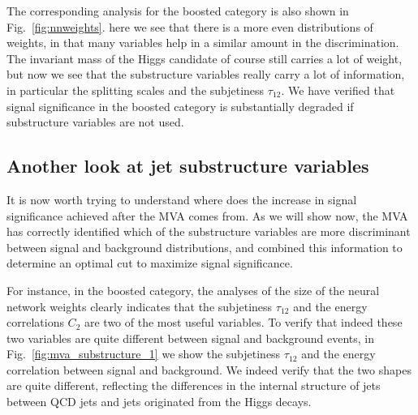 The corresponding analysis for the boosted category is also
shown in Fig.~\ref{fig:nnweights}.
%
here we see that there is a more even distributions of weights, in that many
variables help in a similar amount in the discrimination.
%
The invariant mass of the Higgs candidate of course still carries a lot of weight,
but now we see that the substructure variables really carry  a lot of information,
in particular the splitting scales and the subjetiness $\tau_{12}$.
%
We have verified that signal significance in the boosted category is substantially
degraded if substructure variables are not used.




\subsection{Another look at jet substructure variables}

It is now worth trying to understand where does the increase in signal significance
achieved after the MVA comes from.
%
As we will show now, the MVA has correctly identified which of the substructure
variables are more discriminant between signal and background distributions,
and combined this information to determine an optimal cut to maximize signal
significance.

For instance, in the boosted category, the analyses of the
size of the neural network weights clearly indicates that the subjetiness
$\tau_{12}$ and the energy correlations $C_2$ are two of the most useful
variables.
%
To verify that indeed these two variables are quite different between signal
and background events, in Fig.~\ref{fig:mva_substructure_1}
we show the subjetiness $\tau_{12}$ and the energy correlation between
signal and background.
%
We indeed verify that the two shapes are quite different,
reflecting the differences in the internal structure of jets
between QCD jets and jets originated from the Higgs decays.


